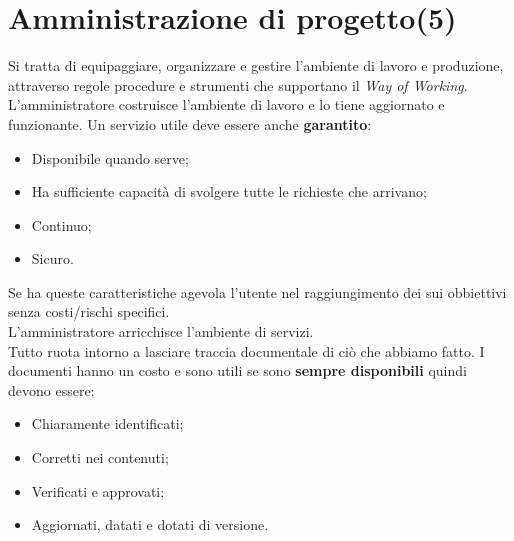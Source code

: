 


\section{Amministrazione di progetto(5)}

Si tratta di equipaggiare, organizzare e gestire l'ambiente di lavoro e produzione, attraverso regole procedure e strumenti che supportano il \textit{Way of Working}.
L'amministratore costruisce l'ambiente di lavoro e lo tiene aggiornato e funzionante. Un servizio utile deve essere anche \textbf{garantito}:

\begin{itemize}

	\item Disponibile quando serve;
	\item Ha sufficiente capacità di svolgere tutte le richieste che arrivano;
	\item Continuo;
	\item Sicuro.

\end{itemize}
Se ha queste caratteristiche agevola l'utente nel raggiungimento dei sui obbiettivi senza costi/rischi specifici.\\

L'amministratore arricchisce l'ambiente di servizi.\\ Tutto ruota intorno a lasciare traccia documentale di ciò che abbiamo fatto. I documenti hanno un costo e sono utili se sono \textbf{sempre disponibili} quindi devono essere:
\begin{itemize}
	\item Chiaramente identificati;
	\item Corretti nei contenuti;
	\item Verificati e approvati;
	\item Aggiornati, datati e dotati di versione.
\end{itemize}

